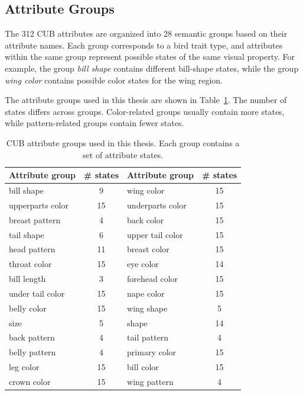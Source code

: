 \subsection{Attribute Groups}

The 312 CUB attributes are organized into 28 semantic groups based on their attribute names. Each group corresponds to a bird trait type, and attributes within the same group represent possible states of the same visual property. For example, the group \textit{bill shape} contains different bill-shape states, while the group \textit{wing color} contains possible color states for the wing region.

The attribute groups used in this thesis are shown in Table~\ref{tab:cub_attribute_groups}. The number of states differs across groups. Color-related groups usually contain more states, while pattern-related groups contain fewer states.

\begin{table}[t]
    \centering
    \caption{CUB attribute groups used in this thesis. Each group contains a set of attribute states.}
    \label{tab:cub_attribute_groups}
    \begin{tabular}{l c l c}
        \hline
        \textbf{Attribute group} & \textbf{\# states} & \textbf{Attribute group} & \textbf{\# states} \\
        \hline
        bill shape & 9 & wing color & 15 \\
        upperparts color & 15 & underparts color & 15 \\
        breast pattern & 4 & back color & 15 \\
        tail shape & 6 & upper tail color & 15 \\
        head pattern & 11 & breast color & 15 \\
        throat color & 15 & eye color & 14 \\
        bill length & 3 & forehead color & 15 \\
        under tail color & 15 & nape color & 15 \\
        belly color & 15 & wing shape & 5 \\
        size & 5 & shape & 14 \\
        back pattern & 4 & tail pattern & 4 \\
        belly pattern & 4 & primary color & 15 \\
        leg color & 15 & bill color & 15 \\
        crown color & 15 & wing pattern & 4 \\
        \hline
    \end{tabular}
\end{table}

